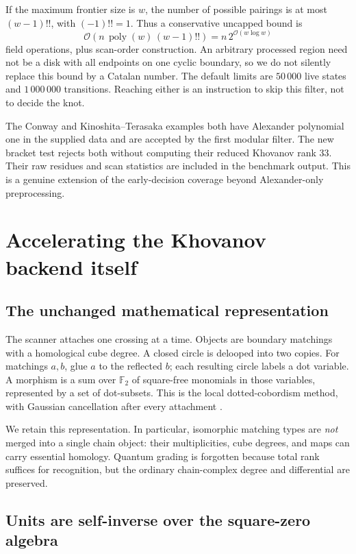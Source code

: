 \documentclass[11pt]{article}
\theoremstyle{remark}\newtheorem{remark}[theorem]{Remark}
\newcommand{\F}{\mathbb F}
\newcommand{\OO}{\mathcal O}
\begin{document}
If the maximum frontier size is $w$, the number of possible pairings is at
most $(w-1)!!$, with $(-1)!!=1$. Thus a conservative uncapped bound is
\[
 \OO\!\left(n\,\operatorname{poly}(w)\,(w-1)!!\right)
 = n\,2^{\OO(w\log w)}
\]
field operations, plus scan-order construction. An arbitrary processed
region need not be a disk with all endpoints on one cyclic boundary, so
we do not silently replace this bound by a Catalan number. The default
limits are $50\,000$ live states and $1\,000\,000$ transitions. Reaching
either is an instruction to skip this filter, not to decide the knot.

The Conway and Kinoshita--Terasaka examples both have Alexander polynomial
one in the supplied data and are accepted by the first modular filter.
The new bracket test rejects both without computing their reduced
Khovanov rank $33$. Their raw residues and scan statistics are included
in the benchmark output. This is a genuine extension of the early-decision
coverage beyond Alexander-only preprocessing.

\section{Accelerating the Khovanov backend itself}
\label{sec:kh}

\subsection{The unchanged mathematical representation}

The scanner attaches one crossing at a time. Objects are boundary matchings
with a homological cube degree. A closed circle is delooped into two copies.
For matchings $a,b$, glue $a$ to the reflected $b$; each resulting circle
labels a dot variable. A morphism is a sum over $\F_2$ of square-free
monomials in those variables, represented by a set of dot-subsets. This is
the local dotted-cobordism method, with Gaussian cancellation after every
attachment \cite{bar-natan}.

We retain this representation. In particular, isomorphic matching types
are \emph{not} merged into a single chain object: their multiplicities,
cube degrees, and maps can carry essential homology. Quantum grading is
forgotten because total rank suffices for recognition, but the ordinary
chain-complex degree and differential are preserved.

\subsection{Units are self-inverse over the square-zero algebra}
\end{document}
